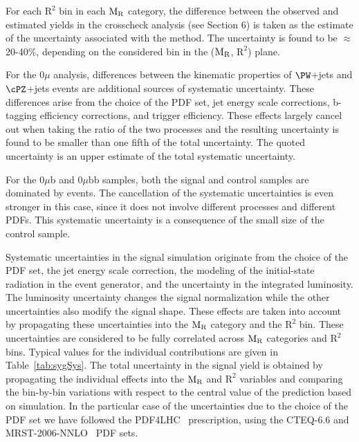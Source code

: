 {{{For each $\mathrm{R^2}$ bin in each $\mathrm{M_{\rm R}}$ category, the
difference between the observed and estimated yields in the
crosscheck analysis (see Section 6) is taken as the estimate of the uncertainty associated with the
method. The uncertainty is found to
be $\approx$ 20-40$\%$, depending on the considered bin in the
($\mathrm{M_{\rm R}}$, $\mathrm{R}^2$) plane. 

For the 0$\mu$ analysis, differences between the kinematic properties of $\PW$+jets and
$\cPZ$+jets events are additional sources of systematic uncertainty. These
differences arise from the choice of the PDF set, jet energy scale corrections, b-tagging efficiency
corrections, and trigger efficiency. These effects largely cancel
out when taking the ratio of the two processes and the resulting %
uncertainty is found to be smaller than one fifth
of the total uncertainty.  The quoted uncertainty is an upper %
estimate of the total systematic uncertainty.

For the 0$\mu$b and 0$\mu$bb samples, both the signal and control samples are dominated by \ttbar events. The cancellation of the
systematic uncertainties is even stronger in
this case, since it does not involve different processes and different
PDFs. This systematic uncertainty is a consequence of the small size of the control sample.

Systematic uncertainties in the signal simulation
originate from the choice of the PDF set,
the jet energy scale correction, the modeling of the initial-state radiation in the event
generator, and the uncertainty in the integrated luminosity. The
luminosity uncertainty changes the signal normalization while the other
uncertainties also modify the signal shape. %
These effects are taken into account by propagating these
uncertainties into the $\mathrm{M_{\rm R}}$ category and the $\mathrm{R^2}$ bin. These uncertainties are
considered to be fully correlated across $\mathrm{M_{\rm R}}$ categories and
$\mathrm{R^2}$ bins. Typical values for the individual contributions
are given in Table~\ref{tab:sygSys}. The total uncertainty in the
signal yield is obtained by propagating the individual effects into
the $\mathrm{M_{\rm R}}$ and $\mathrm{R^2}$ variables and comparing the bin-by-bin variations with respect to the central value of the prediction
based on simulation. In the particular case of the uncertainties due
to the choice of the PDF set we have followed the PDF4LHC~\cite{Bourilkov:2006cj,Alekhin:2011sk,Botje:2011sn} prescription, using the CTEQ-6.6\cite{Nadolsky:2008zw} and MRST-2006-NNLO~\cite{Martin:2007bv} PDF sets.

}}}
